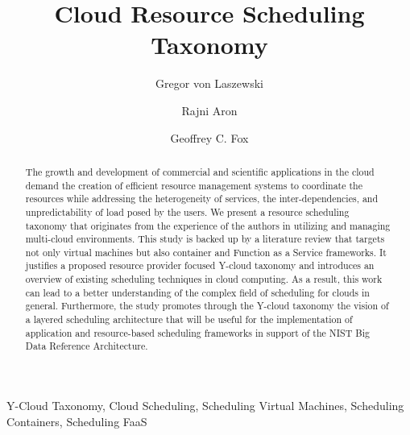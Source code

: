 \documentclass[final,5p,times,twocolumn]{elsarticle}
\author[label1]{Gregor von Laszewski\corref{cor1}\fnref{label3}}
\author[label2]{Rajni Aron}
\author[label1]{Geoffrey C. Fox}
\newcommand{\TITLE}{Cloud Resource Scheduling Taxonomy }
\begin{document}
\onecolumn







\begin{frontmatter}
\title{\TITLE}

\maketitle



\begin{keyword}

 Y-Cloud Taxonomy,
 Cloud Scheduling,
 Scheduling Virtual Machines,
 Scheduling Containers,
 Scheduling FaaS

\end{keyword}

\begin{abstract}

 The growth and development of commercial and scientific applications in the cloud demand the creation of efficient resource management systems to coordinate the resources while addressing the heterogeneity of services, the inter-dependencies, and unpredictability of load posed by the users.
We present a resource scheduling taxonomy that originates from the experience of the authors in utilizing and managing multi-cloud environments. This study is backed up by a literature review that targets not only virtual machines but also container and Function as a Service frameworks. It justifies a proposed resource provider focused Y-cloud taxonomy and introduces an overview of existing scheduling techniques in cloud computing. As a result, this work can lead to a better understanding of the complex field of scheduling for clouds in general. Furthermore, the study promotes through the Y-cloud taxonomy the vision of a layered scheduling architecture that will be useful for the implementation of application and resource-based scheduling frameworks in support of the NIST Big Data Reference Architecture.

\end{abstract}

\end{frontmatter}
\end{document}
